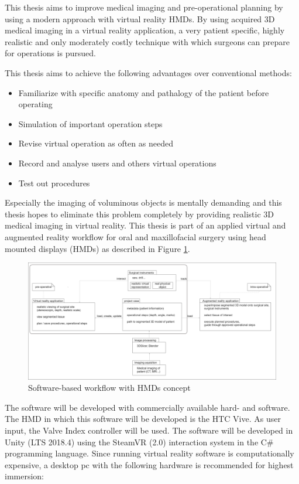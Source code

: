 This thesis aims to improve medical imaging and pre-operational planning by using a modern approach with virtual reality HMDs.
By using acquired 3D medical imaging in a virtual reality application, a very patient specific, highly realistic and only moderately costly technique with which surgeons can prepare for operations is pursued.

This thesis aims to achieve the following advantages over conventional methods:

\begin{itemize}
    \item Familiarize with specific anatomy and pathalogy of the patient before operating
    \item Simulation of important operation steps
    \item Revise virtual operation as often as needed
    \item Record and analyse users and others virtual operations
    \item Test out procedures
\end{itemize}

Especially the imaging of voluminous objects is mentally demanding and this thesis hopes to eliminate this problem completely by providing realistic 3D medical imaging in virtual reality.
This thesis is part of an applied virtual and augmented reality workflow for oral and maxillofacial surgery using head mounted displays (HMDs) as described in Figure \ref{fig::ProjectPlan}.

\begin{figure}[ht!]
    \centering
    \includegraphics[width=\linewidth]{images/project_plan.png}
    \caption{\label{fig::ProjectPlan} Software-based workflow with HMDs concept}
\end{figure}

The software will be developed with commercially available hard- and software.
The HMD in which this software will be developed is the HTC Vive.
As user input, the Valve Index controller will be used.
The software will be developed in Unity (LTS 2018.4) using the SteamVR (2.0) interaction system in the C\# programming language.
Since running virtual reality software is computationally expensive, a desktop pc with the following hardware is recommended for highest immersion:


